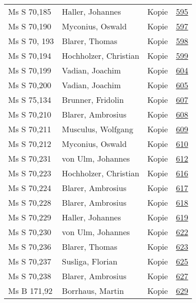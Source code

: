\documentclass[10pt,a4paper,landscape]{report}
\begin{document}
\begin{longtable}{p{16cm}p{4cm}lr}
Ms S 70,185	&	Haller, Johannes	&	Kopie	&	\href{http://130.60.24.72/assignment/595}{595}\\
Ms S 70,190	&	Myconius, Oswald	&	Kopie	&	\href{http://130.60.24.72/assignment/597}{597}\\
Ms S 70, 193	&	Blarer, Thomas	&	Kopie	&	\href{http://130.60.24.72/assignment/598}{598}\\
Ms S 70,194	&	Hochholzer, Christian	&	Kopie	&	\href{http://130.60.24.72/assignment/599}{599}\\
Ms S 70,199	&	Vadian, Joachim	&	Kopie	&	\href{http://130.60.24.72/assignment/604}{604}\\
Ms S 70,200	&	Vadian, Joachim	&	Kopie	&	\href{http://130.60.24.72/assignment/605}{605}\\
Ms S 75,134	&	Brunner, Fridolin	&	Kopie	&	\href{http://130.60.24.72/assignment/607}{607}\\
Ms S 70,210	&	Blarer, Ambrosius	&	Kopie	&	\href{http://130.60.24.72/assignment/608}{608}\\
Ms S 70,211	&	Musculus, Wolfgang	&	Kopie	&	\href{http://130.60.24.72/assignment/609}{609}\\
Ms S 70,212	&	Myconius, Oswald	&	Kopie	&	\href{http://130.60.24.72/assignment/610}{610}\\
Ms S 70,231	&	von Ulm, Johannes	&	Kopie	&	\href{http://130.60.24.72/assignment/612}{612}\\
Ms S 70,223	&	Hochholzer, Christian	&	Kopie	&	\href{http://130.60.24.72/assignment/616}{616}\\
Ms S 70,224	&	Blarer, Ambrosius	&	Kopie	&	\href{http://130.60.24.72/assignment/617}{617}\\
Ms S 70,228	&	Blarer, Ambrosius	&	Kopie	&	\href{http://130.60.24.72/assignment/618}{618}\\
Ms S 70,229	&	Haller, Johannes	&	Kopie	&	\href{http://130.60.24.72/assignment/619}{619}\\
Ms S 70,230	&	von Ulm, Johannes	&	Kopie	&	\href{http://130.60.24.72/assignment/622}{622}\\
Ms S 70,236	&	Blarer, Thomas	&	Kopie	&	\href{http://130.60.24.72/assignment/623}{623}\\
Ms S 70,237	&	Susliga, Florian	&	Kopie	&	\href{http://130.60.24.72/assignment/625}{625}\\
Ms S 70,238	&	Blarer, Ambrosius	&	Kopie	&	\href{http://130.60.24.72/assignment/627}{627}\\
Ms B 171,92	&	Borrhaus, Martin	&	Kopie	&	\href{http://130.60.24.72/assignment/629}{629}\\

\end{longtable}
\end{document}
